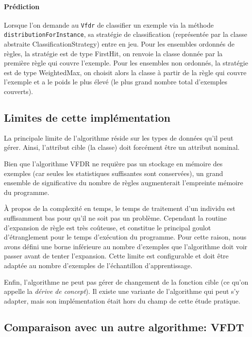         \paragraph{Prédiction} Lorsque l’on demande au \texttt{Vfdr} de classifier un exemple via la méthode \texttt{distributionForInstance}, sa stratégie de classification (représentée par la classe abstraite ClassificationStrategy) entre en jeu. Pour les ensembles ordonnés de règles, la stratégie est de type FirstHit, on renvoie la classe donnée par la première règle qui couvre l’exemple. Pour les ensembles non ordonnés, la stratégie est de type WeightedMax, on choisit alors la classe à partir de la règle qui couvre l’exemple et a le poids le plus élevé (le plus grand nombre total d’exemples couverts).

    \subsection{Limites de cette implémentation}

        La principale limite de l’algorithme réside sur les types de données qu’il peut gérer. Ainsi, l’attribut cible (la classe) doit forcément être un attribut nominal.

        Bien que l’algorithme VFDR ne requière pas un stockage en mémoire des exemples (car seules les statistiques suffisantes sont conservées), un grand ensemble de significative du nombre de règles augmenterait l'empreinte mémoire du programme.

        À propos de la complexité en temps, le temps de traitement d'un individu est suffisamment bas pour qu'il ne soit pas un problème. Cependant la routine d'expansion de règle est très coûteuse, et constitue le principal goulot d'étranglement pour le temps d'exécution du programme. Pour cette raison, nous avons défini une borne inférieure au nombre d'exemples que l'algorithme doit voir passer avant de tenter l'expansion. Cette limite est configurable et doit être adaptée au nombre d'exemples de l'échantillon d'apprentissage.

        Enfin, l’algorithme ne peut pas gérer de changement de la fonction cible (ce qu'on appelle la \emph{dérive de concept}). Il existe une variante de l'algorithme qui peut s'y adapter, mais son implémentation était hors du champ de cette étude pratique.


    \subsection{Comparaison avec un autre algorithme: VFDT}


